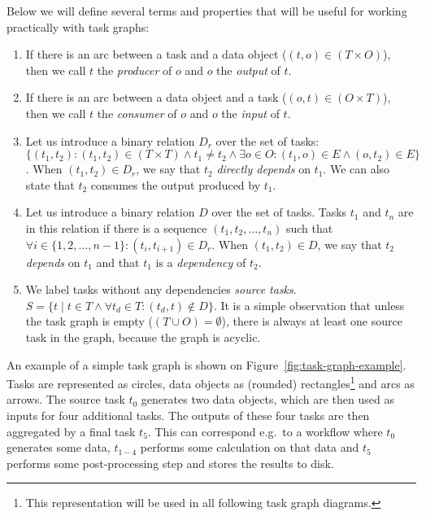 Below we will define several terms and properties that will be useful for working practically with
task graphs:
\begin{enumerate}
	\item If there is an arc between a task and a data object ($(t,o) \in (T\times{}O)$), then we call
	      $t$ the \emph{producer} of $o$ and $o$
	      the \emph{output} of $t$.
	\item If there is an arc between a data object and a task ($(o,t) \in (O\times{}T)$), then we call
	      $t$ the \emph{consumer} of $o$ and $o$
	      the \emph{input} of $t$.

	\item Let us introduce a binary relation $D_r$ over the set of tasks:
	      $\{(t_1, t_2): (t_1, t_2)\in{}(T\times{}T)\land t_1 \neq t_2 \land
		      \exists{}o\in{}O: (t_1, o)\in{}E
		      \land (o, t_2)\in{}E\}$. When $(t_1, t_2) \in D_r$, we say that $t_2$
	      \emph{directly depends} on $t_1$. We can also state that $t_2$
	      consumes the output produced by $t_1$.

	\item Let us introduce a binary relation $D$ over the set of tasks. Tasks
	      $t_1$ and $t_n$ are in this relation if there is a sequence
	      $(t_1, t_2, \ldots, t_n)$ such that $\forall i \in \{
		      1,2,\ldots,n - 1\}: (t_i, t_{i+1}) \in D_r$. When $(t_1, t_2) \in D$, we say that
	      $t_2$ \emph{depends} on $t_1$ and that
	      $t_1$ is a \emph{dependency} of $t_2$.

	\item We label tasks without any dependencies \emph{source tasks}. $S = \{ t \mid t\in{}T \land \forall{}t_d\in{}T:
		      (t_d, t)\notin D\}$. It is a
	      simple observation that unless the task graph is empty ($(T\cup{}O) = \emptyset$), there is always at
	      least one source task in the graph, because the graph is acyclic.
\end{enumerate}

An example of a simple task graph is shown on Figure~\ref{fig:task-graph-example}. Tasks are represented
as circles, data objects as (rounded) rectangles\footnote{This representation will be used in all following task graph diagrams.} and arcs as arrows. The
source task $t_0$ generates two data objects, which are then used as inputs for
four additional tasks. The outputs of these four tasks are then aggregated by a final task
$t_5$. This can correspond e.g.\ to a workflow where $t_0$
generates some data, $t_{1-4}$ performs some calculation on that data and
$t_5$ performs some post-processing step and stores the results to disk.

